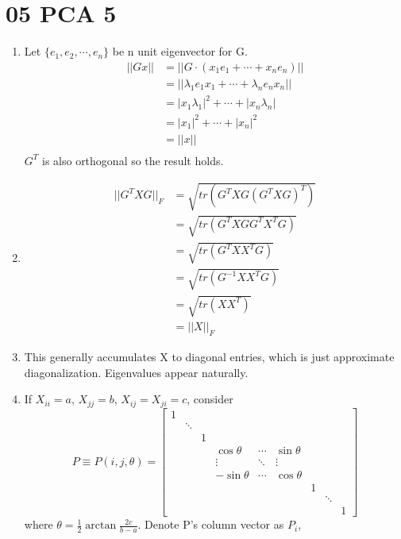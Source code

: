 \documentclass[10pt, oneside]{article}
\begin{document}
\section{05 PCA 5}
\begin{enumerate}
	\item Let $\{e_1,e_2,\cdots,e_n\}$ be n unit eigenvector for G. 
	$$
	\begin{aligned}
		||Gx||&=||G\cdot(x_1e_1+\cdots+x_ne_n)||\\
		&=||\lambda_1e_1x_1+\cdots+\lambda_ne_nx_n||\\
		&=|x_1\lambda_1|^2+\cdots+|x_n\lambda_n|\\
		&=|x_1|^2+\cdots+|x_n|^2\\
		&=||x||\\
	\end{aligned}
	$$
	$G^T$ is also orthogonal so the result holds. 
	\item $$
	\begin{aligned}
	||G^TXG||_F&=\sqrt{tr(G^TXG(G^TXG)^T)}\\
	&=\sqrt{tr(G^TXGG^TX^TG)}\\
	&=\sqrt{tr(G^TXX^TG)}\\
	&=\sqrt{tr(G^{-1}XX^TG)}\\
	&=\sqrt{tr(XX^T)}\\
	&=||X||_F
	\end{aligned}
	$$
	\item This generally accumulates X to diagonal entries, which is just approximate diagonalization. Eigenvalues appear naturally. 
	\item If $X_{ii}=a$, $X_{jj}=b$, $X_{ij}=X_{ji}=c$, consider
	$$
	P \equiv P(i, j, \theta)=\left[\begin{array}{ccccccccc}
	1 & & & & & & & & \\
	& \ddots & & & & & & & \\
	& & 1 & & & & & &  \\
	& & & \cos \theta & \cdots & \sin \theta & & & \\
	& & & \vdots & \ddots & \vdots & & & \\
	& & &- \sin \theta & \cdots & \cos \theta && &  \\
	& & & & & & 1 & &  \\
	& & & & & & & \ddots & \\
	& & & & & & & & 1
	\end{array}\right]
	$$
	where $\theta=\frac{1}{2}\arctan \frac{2c}{b-a}$. Denote P's column vector as $P_i$, 
	$$
	\begin{aligned}

\end{aligned}$$
\end{enumerate}
\end{document}
